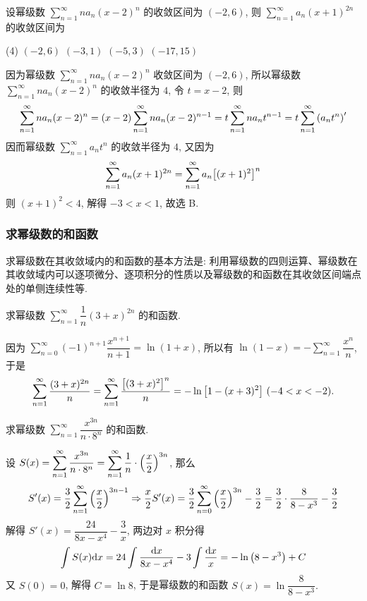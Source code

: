 \begin{example}[2020 数三]
    设幂级数 $\displaystyle\sum_{n=1}^{\infty}na_n(x-2)^n$ 的收敛区间为 $(-2,6)$, 则 $\displaystyle\sum_{n=1}^{\infty}a_n(x+1)^{2n}$ 的收敛区间为
    \begin{tasks}(4)
        \task $(-2,6)$
        \task $(-3,1)$
        \task $(-5,3)$
        \task $(-17,15)$
    \end{tasks}
\end{example}
\begin{solution}
    因为幂级数 $\displaystyle\sum_{n=1}^{\infty}na_n(x-2)^n$ 收敛区间为 $(-2,6)$, 所以幂级数 $\displaystyle\sum_{n=1}^{\infty}na_n(x-2)^n$ 的收敛半径为 $4$, 令 $t=x-2$, 则
    $$\sum_{n=1}^{\infty}na_n(x-2)^n=(x-2)\sum_{n=1}^{\infty}na_n(x-2)^{n-1}=t\sum_{n=1}^{\infty}na_nt^{n-1}=t\sum_{n=1}^{\infty}\qty(a_nt^n)'$$
    因而幂级数 $\displaystyle\sum_{n=1}^{\infty}a_nt^n$ 的收敛半径为 $4$, 又因为 $$\sum_{n=1}^{\infty}a_n(x+1)^{2n}=\sum_{n=1}^{\infty}a_n\qty[(x+1)^2]^n$$
    则 $(x+1)^2<4$, 解得 $-3<x<1$, 故选 B.
\end{solution}

\subsubsection{求幂级数的和函数}

求幂级数在其收敛域内的和函数的基本方法是: 利用幂级数的四则运算、幂级数在其收敛域内可以逐项微分、逐项积分的性质以及幂级数的和函数在其收敛区间端点处的单侧连续性等.

\begin{example}
    求幂级数 $\displaystyle\sum_{n=1}^{\infty}\dfrac{1}{n}(3+x)^{2n}$ 的和函数.
\end{example}
\begin{solution}
    因为 $\displaystyle \sum_{n=0}^{\infty}(-1)^{n+1}\dfrac{x^{n+1}}{n+1}=\ln(1+x)$, 所以有
    $\displaystyle\ln(1-x)=-\sum_{n=1}^{\infty}\dfrac{x^n}{n}$, 
    于是 $$\displaystyle\sum_{n=1}^{\infty}\dfrac{(3+x)^{2n}}{n}=\sum_{n=1}^{\infty}\dfrac{\qty[(3+x)^{2}]^{n}}{n}=-\ln\qty[1-(x+3)^2]~ (-4<x<-2).$$
\end{solution}

\begin{example}
    求幂级数 $\displaystyle\sum_{n=1}^{\infty}\dfrac{x^{3n}}{n\cdot 8^n}$ 的和函数.
\end{example}
\begin{solution}
    设 $S(x)=\displaystyle\sum_{n=1}^{\infty}\dfrac{x^{3n}}{n\cdot 8^n}=\sum_{n=1}^{\infty}\dfrac{1}{n}\cdot\qty(\dfrac{x}{2})^{3n}$, 那么
    $$S'(x)=\dfrac{3}{2}\sum_{n=1}^{\infty}\qty(\dfrac{x}{2})^{3n-1}\Rightarrow \dfrac{x}{2}S'(x)=\dfrac{3}{2}\sum_{n=0}^{\infty}\qty(\dfrac{x}{2})^{3n}-\dfrac{3}{2}=\dfrac{3}{2}\cdot\dfrac{8}{8-x^3}-\dfrac{3}{2}$$
    解得 $S'(x)=\dfrac{24}{8x-x^4}-\dfrac{3}{x}$, 两边对 $x$ 积分得
    $$\int S(x)\dd x=24\int\dfrac{\dd x}{8x-x^4}-3\int\dfrac{\dd x}{x}=-\ln\qty(8-x^3)+C$$
    又 $S(0)=0$, 解得 $C=\ln8$, 于是幂级数的和函数 $S(x)=\ln\dfrac{8}{8-x^3}.$
\end{solution}

